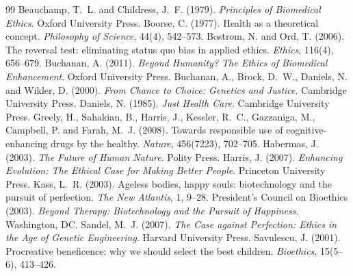\documentclass{situationist-preprint}
\begin{document}
\begin{thebibliography}{99}\small
{} Beauchamp, T.~L. and Childress, J.~F. (1979). \emph{Principles of Biomedical Ethics}. Oxford University Press.
 Boorse, C. (1977). Health as a theoretical concept. \emph{Philosophy of Science}, 44(4), 542--573.
 Bostrom, N. and Ord, T. (2006). The reversal test: eliminating status quo bias in applied ethics. \emph{Ethics}, 116(4), 656--679.
 Buchanan, A. (2011). \emph{Beyond Humanity? The Ethics of Biomedical Enhancement}. Oxford University Press.
 Buchanan, A., Brock, D.~W., Daniels, N. and Wikler, D. (2000). \emph{From Chance to Choice: Genetics and Justice}. Cambridge University Press.
 Daniels, N. (1985). \emph{Just Health Care}. Cambridge University Press.
 Greely, H., Sahakian, B., Harris, J., Kessler, R.~C., Gazzaniga, M., Campbell, P. and Farah, M.~J. (2008). Towards responsible use of cognitive-enhancing drugs by the healthy. \emph{Nature}, 456(7223), 702--705.
 Habermas, J. (2003). \emph{The Future of Human Nature}. Polity Press.
 Harris, J. (2007). \emph{Enhancing Evolution: The Ethical Case for Making Better People}. Princeton University Press.
 Kass, L.~R. (2003). Ageless bodies, happy souls: biotechnology and the pursuit of perfection. \emph{The New Atlantis}, 1, 9--28.
 President's Council on Bioethics (2003). \emph{Beyond Therapy: Biotechnology and the Pursuit of Happiness}. Washington, DC.
 Sandel, M.~J. (2007). \emph{The Case against Perfection: Ethics in the Age of Genetic Engineering}. Harvard University Press.
 Savulescu, J. (2001). Procreative beneficence: why we should select the best children. \emph{Bioethics}, 15(5--6), 413--426.
\end{thebibliography}
\end{document}
